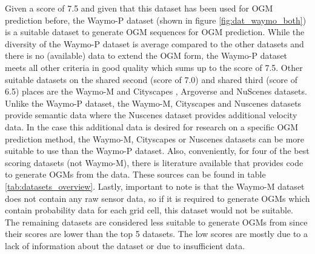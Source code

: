 Given a score of 7.5 and given that this dataset has been used for \gls{OGM} prediction before, the Waymo-P \cite{sun2020scalability} dataset (shown in figure \ref{fig:dat_waymo_both}) is a suitable dataset to generate \gls{OGM} sequences for \gls{OGM} prediction. While the diversity of the Waymo-P dataset is average compared to the other datasets and there is no (available) data to extend the \gls{OGM} form, the Waymo-P dataset meets all other criteria in good quality which sums up to the score of 7.5. Other suitable datasets on the shared second (score of 7.0) and shared third (score of 6.5) places are the Waymo-M \cite{ettinger2021large} and Cityscapes \cite{cordts2016cityscapes}, Argoverse \cite{chang2019argoverse} and NuScenes \cite{caesar2020nuscenes} datasets. Unlike the Waymo-P dataset, the Waymo-M, Cityscapes and Nuscenes datasets provide semantic data where the Nuscenes dataset provides additional velocity data. In the case this additional data is desired for research on a specific \gls{OGM} prediction method, the Waymo-M, Cityscapes or Nuscenes datasets can be more suitable to use than the Waymo-P dataset. Also, conveniently, for four of the best scoring datasets (not Waymo-M), there is literature available that provides code to generate \glspl{OGM} from the data. These sources can be found in table \ref{tab:datasets_overview}. Lastly, important to note is that the Waymo-M dataset does not contain any raw sensor data, so if it is required to generate \glspl{OGM} which contain probability data for each grid cell, this dataset would not be suitable. The remaining datasets are considered less suitable to generate \glspl{OGM} from since their scores are lower than the top 5 datasets. The low scores are mostly due to a lack of information about the dataset or due to insufficient data.

